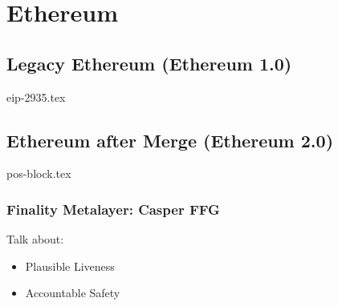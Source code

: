 
\chapter{Ethereum}

\section{Legacy Ethereum (Ethereum 1.0)}
{eip-2935.tex}
\section{Ethereum after Merge (Ethereum 2.0)}
{pos-block.tex}
\subsection{Finality Metalayer: Casper FFG}
Talk about:
\begin{itemize}
    \item Plausible Liveness
    \item Accountable Safety
\end{itemize}